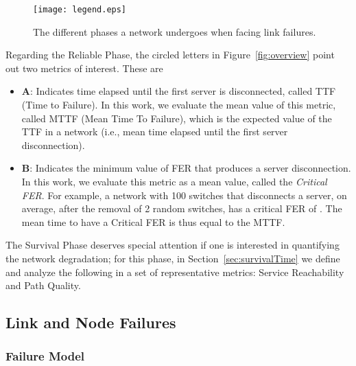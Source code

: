 \begin{figure}
\centering
{\texttt{[image: legend.eps]}}\\
\caption{The different phases a network undergoes when facing link failures.}
\label{fig:phases}
\end{figure}

Regarding the Reliable Phase, the circled letters in Figure~\ref{fig:overview} point out two metrics of interest. These are

\begin{itemize}
\item \textbf {A}: Indicates time elapsed until the first server is disconnected, called TTF (Time to Failure). In this work, we evaluate the mean value of this metric, called MTTF (Mean Time To Failure), which is the expected value of the TTF in a network (i.e., mean time elapsed until the first server disconnection).
\item \textbf {B}: Indicates the minimum value of FER that produces a server disconnection. In this work, we evaluate this metric as a mean value, called the \textit{Critical FER}. 
For example, a network with 100 switches that disconnects a server, on average, after the removal of 2 random switches, has a critical FER of . The mean time to have a Critical FER is thus equal to the MTTF.
\end{itemize}

The Survival Phase deserves special attention if one is interested in quantifying the network degradation; for this phase, in Section~\ref{sec:survivalTime} we define and analyze the following in a set of representative metrics: Service Reachability and Path Quality.

\subsection{Link and Node Failures}
\subsubsection{Failure Model}
\label{sec:failureModel}

